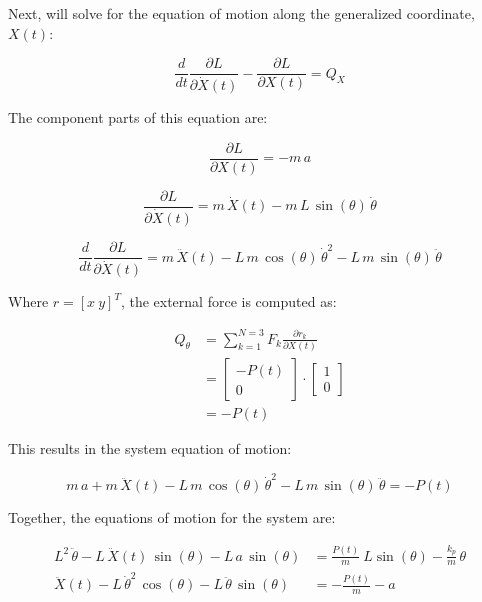 \documentclass[12pt, letterpaper]{../assignment}
\begin{document}
Next, will solve for the equation of motion along the generalized coordinate, $X(t)$:

$$ \frac{d}{d t} \frac{\partial L}{\partial \dot{X}(t)} - \frac{\partial L}{\partial X(t)} = Q_X $$

The component parts of this equation are:

$$ \frac{\partial L}{\partial X(t)} = 
-m\,a  $$

$$ \frac{\partial L}{\partial \dot{X}(t)}  =
m\,\dot{X}(t)-m\,L\,\sin\left(\theta\right)\,\dot{\theta} $$

$$ \frac{d}{d t} \frac{\partial L}{\partial \dot{X}(t)} =
m\,\ddot{X}(t)-L\,m\,\cos\left(\theta\right)\,{\dot{\theta}}^2-L\,m\,\sin\left(\theta\right)\,\ddot{\theta} $$

Where $r = [x \ y]^T$, the external force is computed as:

\begin{equation*}
\begin{aligned}
Q_\theta &= \sum_{k=1}^{N=3} F_k \frac{\partial r_k }{\partial X(t)}\\
&=\left[\begin{array}{c} -P\left(t\right)\\ 0 \end{array}\right] \cdot \left[\begin{array}{c} 1\\ 0 \end{array}\right]\\
&= -P(t)
\end{aligned}
\end{equation*}

This results in the system equation of motion:

$$ m\,a+m\,\ddot{X}(t)-L\,m\,\cos\left(\theta\right)\,{\dot{\theta}}^2-L\,m\,\sin\left(\theta\right)\,\ddot{\theta} = -P(t)   $$

Together, the equations of motion for the system are:

\begin{answer}
    \begin{equation*}
        \begin{aligned}
            L^2\,\ddot{\theta}-L\,\ddot{X}(t)\,\sin\left(\theta\right)-L\,a\,\sin\left(\theta\right) &=  \frac{P(t)}{m}\ L \sin(\theta) - \frac{k_{p}}{m}\,\theta \\
            \ddot{X}(t)-L\,{\dot{\theta}}^2\,\cos\left(\theta\right)-L\,\ddot{\theta}\,\sin\left(\theta\right) &= -\frac{P(t)}{m} - a 
        \end{aligned}
    \end{equation*}
\end{answer}
\end{document}
